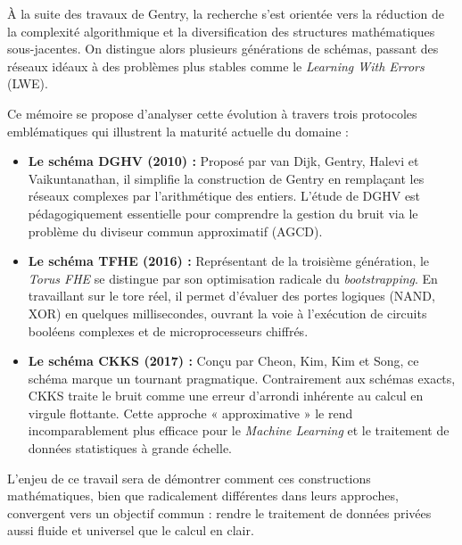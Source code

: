 À la suite des travaux de Gentry, la recherche s'est orientée vers la réduction de la complexité algorithmique et la diversification des structures mathématiques sous-jacentes. On distingue alors plusieurs générations de schémas, passant des réseaux idéaux à des problèmes plus stables comme le \textit{Learning With Errors} (LWE). 

Ce mémoire se propose d'analyser cette évolution à travers trois protocoles emblématiques qui illustrent la maturité actuelle du domaine :

\begin{itemize}
    \item \textbf{Le schéma DGHV (2010) :} Proposé par van Dijk, Gentry, Halevi et Vaikuntanathan, il simplifie la construction de Gentry en remplaçant les réseaux complexes par l'arithmétique des entiers. L'étude de DGHV est pédagogiquement essentielle pour comprendre la gestion du bruit via le problème du diviseur commun approximatif (AGCD).
    
    \item \textbf{Le schéma TFHE (2016) :} Représentant de la troisième génération, le \textit{Torus FHE} se distingue par son optimisation radicale du \textit{bootstrapping}. En travaillant sur le tore réel, il permet d'évaluer des portes logiques (NAND, XOR) en quelques millisecondes, ouvrant la voie à l'exécution de circuits booléens complexes et de microprocesseurs chiffrés.
    
    \item \textbf{Le schéma CKKS (2017) :} Conçu par Cheon, Kim, Kim et Song, ce schéma marque un tournant pragmatique. Contrairement aux schémas exacts, CKKS traite le bruit comme une erreur d'arrondi inhérente au calcul en virgule flottante. Cette approche « approximative » le rend incomparablement plus efficace pour le \textit{Machine Learning} et le traitement de données statistiques à grande échelle.
\end{itemize}

L'enjeu de ce travail sera de démontrer comment ces constructions mathématiques, bien que radicalement différentes dans leurs approches, convergent vers un objectif commun : rendre le traitement de données privées aussi fluide et universel que le calcul en clair.
